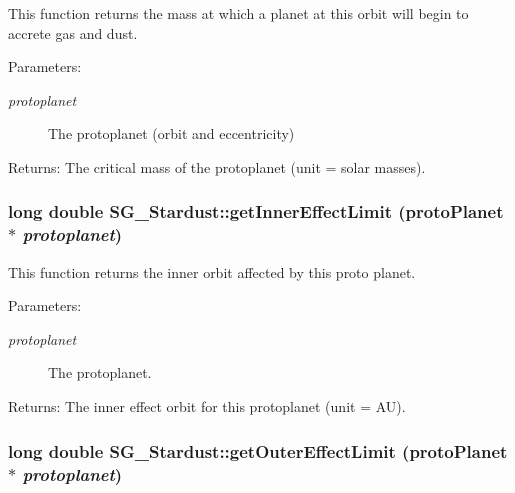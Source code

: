 This function returns the mass at which a planet at this orbit will begin to accrete gas and dust. 

\begin{Desc}
\item[Parameters:]
\begin{description}
\item[{\em protoplanet}]The protoplanet (orbit and eccentricity) \end{description}
\end{Desc}
\begin{Desc}
\item[Returns:]The critical mass of the protoplanet (unit = solar masses). \end{Desc}
\subsubsection{\setlength{\rightskip}{0pt plus 5cm}long double SG\_\-Stardust::get\-Inner\-Effect\-Limit (proto\-Planet $\ast$ {\em protoplanet})\hspace{0.3cm}{\tt  [protected]}}\label{class_s_g___stardust_b1}


This function returns the inner orbit affected by this proto planet. 

\begin{Desc}
\item[Parameters:]
\begin{description}
\item[{\em protoplanet}]The protoplanet. \end{description}
\end{Desc}
\begin{Desc}
\item[Returns:]The inner effect orbit for this protoplanet (unit = AU). \end{Desc}
\subsubsection{\setlength{\rightskip}{0pt plus 5cm}long double SG\_\-Stardust::get\-Outer\-Effect\-Limit (proto\-Planet $\ast$ {\em protoplanet})\hspace{0.3cm}{\tt  [protected]}}\label{class_s_g___stardust_b2}


